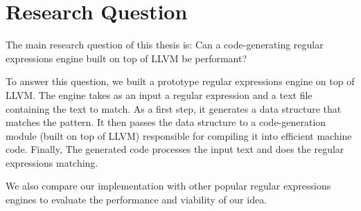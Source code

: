 \section{Research Question}\label{researchq}

The main research question of this thesis is: Can a code-generating regular expressions engine built on top of LLVM be performant?

To answer this question, we built a prototype regular expressions engine on top of LLVM. The engine takes as an input a regular expression and a text file containing the text to match. As a first step, it generates a data structure that matches the pattern. It then passes the data structure to a code-generation module (built on top of LLVM) responsible for compiling it into efficient machine code. Finally, The generated code processes the input text and does the regular expressions matching.

We also compare our implementation with other popular regular expressions engines to evaluate the performance and viability of our idea. 